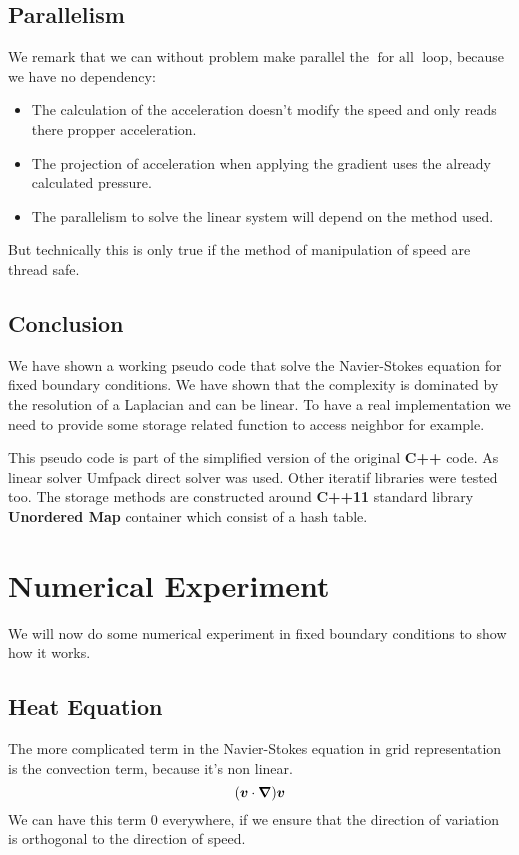 \subsection{Parallelism}

We remark that we can without problem make parallel the $\mathop{\textbf{for all}}$ loop, because we have no dependency:
\begin{itemize}
 \item The calculation of the acceleration doesn't modify the speed and only reads there propper acceleration.
 \item The projection of acceleration when applying the gradient uses the already calculated pressure.
 \item The parallelism to solve the linear system will depend on the method used.
\end{itemize}

But technically this is only true if the method of manipulation of speed are thread safe.

\subsection{Conclusion}

We have shown a working pseudo code that solve the Navier-Stokes equation for fixed boundary conditions.
We have shown that the complexity is dominated by the resolution of a Laplacian and can be linear.
To have a real implementation we need to provide some storage related function to access neighbor for example.

This pseudo code is part of the simplified version of the original \textbf{C++} code.
As linear solver Umfpack direct solver was used. Other iteratif libraries were tested too.
The storage methods are constructed around \textbf{C++11} standard library \textbf{Unordered Map} container which consist of a hash table.

\FloatBarrier
\section{Numerical Experiment}

We will now do some numerical experiment in fixed boundary conditions to show how it works.

\subsection{Heat Equation}

The more complicated term in the Navier-Stokes equation in grid representation is the convection term, because it's non linear.
\begin{equation}
	({\boldsymbol {v}}\cdot {\boldsymbol {\nabla}}){\boldsymbol {v}}
\end{equation}
We can have this term $0$ everywhere, if we ensure that the direction of variation is orthogonal to the direction of speed.

